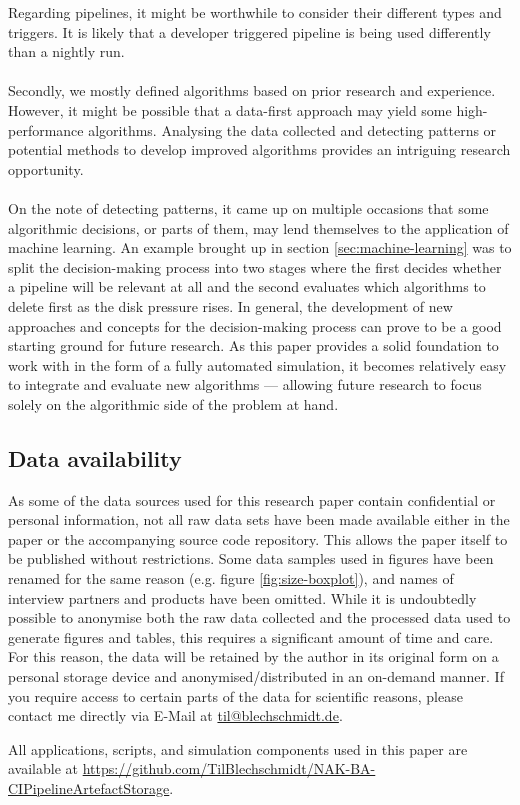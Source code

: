         Regarding pipelines, it might be worthwhile to consider their different types and triggers. It is likely that a developer triggered pipeline is being used differently than a nightly run.\\
        \\
        Secondly, we mostly defined algorithms based on prior research and experience. However, it might be possible that a data-first approach may yield some high-performance algorithms. Analysing the data collected and detecting patterns or potential methods to develop improved algorithms provides an intriguing research opportunity.\\
        \\
        On the note of detecting patterns, it came up on multiple occasions that some algorithmic decisions, or parts of them, may lend themselves to the application of machine learning. An example brought up in section \ref{sec:machine-learning} was to split the decision-making process into two stages where the first decides whether a pipeline will be relevant at all and the second evaluates which algorithms to delete first as the disk pressure rises. In general, the development of new approaches and concepts for the decision-making process can prove to be a good starting ground for future research. As this paper provides a solid foundation to work with in the form of a fully automated simulation, it becomes relatively easy to integrate and evaluate new algorithms — allowing future research to focus solely on the algorithmic side of the problem at hand.
    
    \subsection{Data availability}\label{sec:data-availability}
        As some of the data sources used for this research paper contain confidential or personal information, not all raw data sets have been made available either in the paper or the accompanying source code repository. This allows the paper itself to be published without restrictions. Some data samples used in figures have been renamed for the same reason (e.g. figure \ref{fig:size-boxplot}), and names of interview partners and products have been omitted. While it is undoubtedly possible to anonymise both the raw data collected and the processed data used to generate figures and tables, this requires a significant amount of time and care. For this reason, the data will be retained by the author in its original form on a personal storage device and anonymised/distributed in an on-demand manner. If you require access to certain parts of the data for scientific reasons, please contact me directly via E-Mail at \href{mailto:til@blechschmidt.de}{til@blechschmidt.de}.
        
        All applications, scripts, and simulation components used in this paper are available at \href{https://github.com/TilBlechschmidt/NAK-BA-CIPipelineArtefactStorage}{https://github.com/TilBlechschmidt/NAK-BA-CIPipelineArtefactStorage}.